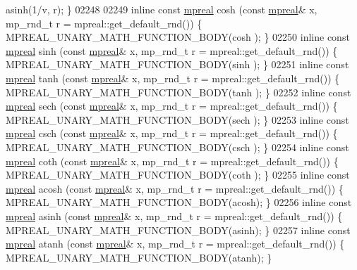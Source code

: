 \begin{DoxyCode}
{{      asinh(1/v, r);                      \}
02248 
02249 \textcolor{keyword}{inline} \textcolor{keyword}{const} \hyperlink{classmpfr_1_1mpreal}{mpreal} cosh  (\textcolor{keyword}{const} \hyperlink{classmpfr_1_1mpreal}{mpreal}& x, mp\_rnd\_t r = mpreal::get\_default\_rnd()) \{   
      MPREAL\_UNARY\_MATH\_FUNCTION\_BODY(cosh );    \}
02250 \textcolor{keyword}{inline} \textcolor{keyword}{const} \hyperlink{classmpfr_1_1mpreal}{mpreal} sinh  (\textcolor{keyword}{const} \hyperlink{classmpfr_1_1mpreal}{mpreal}& x, mp\_rnd\_t r = mpreal::get\_default\_rnd()) \{   
      MPREAL\_UNARY\_MATH\_FUNCTION\_BODY(sinh );    \}
02251 \textcolor{keyword}{inline} \textcolor{keyword}{const} \hyperlink{classmpfr_1_1mpreal}{mpreal} tanh  (\textcolor{keyword}{const} \hyperlink{classmpfr_1_1mpreal}{mpreal}& x, mp\_rnd\_t r = mpreal::get\_default\_rnd()) \{   
      MPREAL\_UNARY\_MATH\_FUNCTION\_BODY(tanh );    \}
02252 \textcolor{keyword}{inline} \textcolor{keyword}{const} \hyperlink{classmpfr_1_1mpreal}{mpreal} sech  (\textcolor{keyword}{const} \hyperlink{classmpfr_1_1mpreal}{mpreal}& x, mp\_rnd\_t r = mpreal::get\_default\_rnd()) \{   
      MPREAL\_UNARY\_MATH\_FUNCTION\_BODY(sech );    \}
02253 \textcolor{keyword}{inline} \textcolor{keyword}{const} \hyperlink{classmpfr_1_1mpreal}{mpreal} csch  (\textcolor{keyword}{const} \hyperlink{classmpfr_1_1mpreal}{mpreal}& x, mp\_rnd\_t r = mpreal::get\_default\_rnd()) \{   
      MPREAL\_UNARY\_MATH\_FUNCTION\_BODY(csch );    \}
02254 \textcolor{keyword}{inline} \textcolor{keyword}{const} \hyperlink{classmpfr_1_1mpreal}{mpreal} coth  (\textcolor{keyword}{const} \hyperlink{classmpfr_1_1mpreal}{mpreal}& x, mp\_rnd\_t r = mpreal::get\_default\_rnd()) \{   
      MPREAL\_UNARY\_MATH\_FUNCTION\_BODY(coth );    \}
02255 \textcolor{keyword}{inline} \textcolor{keyword}{const} \hyperlink{classmpfr_1_1mpreal}{mpreal} acosh (\textcolor{keyword}{const} \hyperlink{classmpfr_1_1mpreal}{mpreal}& x, mp\_rnd\_t r = mpreal::get\_default\_rnd()) \{   
      MPREAL\_UNARY\_MATH\_FUNCTION\_BODY(acosh);    \}
02256 \textcolor{keyword}{inline} \textcolor{keyword}{const} \hyperlink{classmpfr_1_1mpreal}{mpreal} asinh (\textcolor{keyword}{const} \hyperlink{classmpfr_1_1mpreal}{mpreal}& x, mp\_rnd\_t r = mpreal::get\_default\_rnd()) \{   
      MPREAL\_UNARY\_MATH\_FUNCTION\_BODY(asinh);    \}
02257 \textcolor{keyword}{inline} \textcolor{keyword}{const} \hyperlink{classmpfr_1_1mpreal}{mpreal} atanh (\textcolor{keyword}{const} \hyperlink{classmpfr_1_1mpreal}{mpreal}& x, mp\_rnd\_t r = mpreal::get\_default\_rnd()) \{   
      MPREAL\_UNARY\_MATH\_FUNCTION\_BODY(atanh);    \}
}}
\end{DoxyCode}
